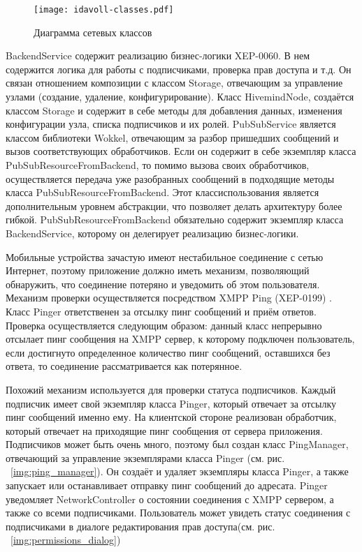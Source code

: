 \begin{figure}
  \centering
  \texttt{[image: idavoll-classes.pdf]}
  \caption{Диаграмма сетевых классов}
  \label{img:network_classes}
\end{figure}

BackendService содержит реализацию бизнес-логики XEP-0060. В нем содержится
логика для работы с подписчиками, проверка прав доступа и т.д. Он связан
отношением композиции с классом Storage, отвечающим за управление узлами
(создание, удаление, конфигурирование). Класс HivemindNode, создаётся классом
Storage и содержит в себе методы для добавления данных, изменения конфигурации
узла, списка подписчиков и их ролей. PubSubService является классом библиотеки
Wokkel, отвечающим за разбор пришедших сообщений и вызов соответствующих
обработчиков. Если он содержит в себе экземпляр класса
PubSubResourceFromBackend, то помимо вызова своих обработчиков, осуществляется
передача уже разобранных сообщений в подходящие методы класса
PubSubResourceFromBackend. Этот классиспользования является дополнительным
уровнем абстракции, что позволяет делать архитектуру более гибкой.
PubSubResourceFromBackend обязательно содержит экземпляр класса BackendService,
которому он делегирует реализацию бизнес-логики.

Мобильные устройства зачастую имеют нестабильное соединение с сетью Интернет,
поэтому приложение должно иметь механизм, позволяющий обнаружить, что соединение
потеряно и уведомить об этом пользователя. Механизм проверки осуществляется
посредством XMPP Ping (XEP-0199) \cite{xep-0199}. Класс Pinger
ответственен за отсылку пинг сообщений и приём ответов. Проверка осуществляется
следующим образом: данный класс непрерывно отсылает пинг сообщения на XMPP
сервер, к которому подключен пользователь, если достигнуто определенное
количество пинг сообщений, оставшихся без ответа, то соединение рассматривается
как потерянное.

Похожий механизм используется для проверки статуса подписчиков. Каждый подписчик
имеет свой экземпляр класса Pinger, который отвечает за отсылку пинг сообщений
именно ему. На клиентской стороне реализован обработчик, который отвечает на
приходящие пинг сообщения от сервера приложения. Подписчиков может быть очень
много, поэтому был создан класс PingManager, отвечающий за управление
экземплярами класса Pinger (см. рис. ~\ref{img:ping_manager}). Он создаёт и
удаляет экземпляры класса Pinger, а также запускает или останавливает отправку
пинг сообщений до адресата. Pinger уведомляет NetworkController о состоянии
соединения с XMPP сервером, а также со всеми подписчиками. Пользователь может
увидеть статус соединения с подписчиками в диалоге редактирования прав
доступа(см. рис. ~\ref{img:permissions_dialog})

